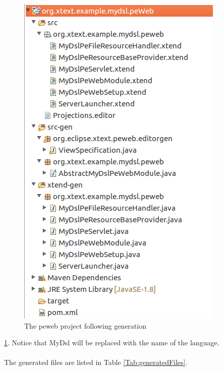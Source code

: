 \documentclass{article}
\begin{document}
\begin{figure}[h!]
  \centering
  \includegraphics[width=0.4\linewidth]{./Screenshots/peWebProjectContentsAfterGeneration.png}
  \caption{The peweb project following generation}
  \label{fig:generatedPeWebProject}
\end{figure} \ref{fig:generatedPeWebProject}. Notice that MyDsl will be replaced with the name of the language.
\\
\\
The generated files are listed in Table \ref{Tab:generatedFiles}.
\end{document}
